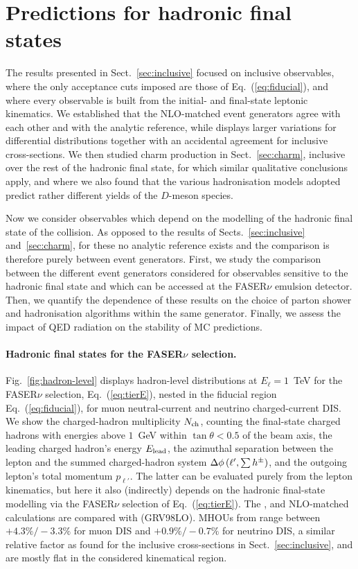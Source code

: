 \section{Predictions for hadronic final states}
\label{sec:hadronic}

The results presented in Sect.~\ref{sec:inclusive} focused on inclusive observables, where the only acceptance cuts imposed are those of Eq.~(\ref{eq:fiducial}), and where every observable is built from the initial- and final-state leptonic kinematics.
%
We established that the NLO-matched event generators agree with each other and with the analytic \yadism reference, while \genie displays larger variations for differential distributions together with an accidental agreement for inclusive cross-sections.
%
We then studied charm production in Sect.~\ref{sec:charm}, inclusive over the rest of the hadronic final state, for which similar qualitative conclusions apply, and where we also found that the various hadronisation models adopted predict rather different yields of the $D$-meson species.

Now we consider observables which depend on the modelling of the hadronic final state of the collision.
%
As opposed to the results of Sects.~\ref{sec:inclusive} and~\ref{sec:charm}, for these no analytic reference exists and the comparison is therefore purely between event generators.
%
First, we study the comparison between the different event generators considered for observables sensitive to the hadronic final state and which can be accessed at the FASER$\nu$ emulsion detector.
%
Then, we quantify the dependence of these results on the choice of parton shower and hadronisation algorithms within the same  generator.
%
Finally, we assess the impact of QED radiation on the stability of MC predictions.

\paragraph{Hadronic final states for the FASER$\nu$ selection.}
%
Fig.~\ref{fig:hadron-level} displays hadron-level distributions at $E_\ell = 1$~TeV for the FASER$\nu$ selection, Eq.~(\ref{eq:tierE}), nested in the fiducial region Eq.~(\ref{eq:fiducial}), for muon neutral-current and neutrino charged-current DIS.
%
We show the charged-hadron multiplicity $N_{\rm ch}$, counting the final-state charged hadrons with energies above $1$~GeV within $\tan\theta < 0.5$ of the beam axis, the leading charged hadron's energy $E_{\rm lead}$, the azimuthal separation between the lepton and the summed charged-hadron system $\Delta\phi\left( \ell',\sum h^\pm\right)$, and the outgoing lepton's total momentum $p_{\ell'}$.
%
The latter can be evaluated purely from the lepton kinematics, but here it also (indirectly) depends on the hadronic final-state modelling via the FASER$\nu$ selection of Eq.~(\ref{eq:tierE}). 
%
The \powheg, \sherpa and \herwig NLO-matched calculations are compared with \genie (GRV98LO).
%
MHOUs from \powheg range between
$+4.3\%/-3.3\%$ for muon DIS and $+0.9\%/-0.7\%$ for neutrino DIS, a similar relative factor as found for the inclusive cross-sections in Sect.~\ref{sec:inclusive}, and are mostly flat in the considered kinematical region.

